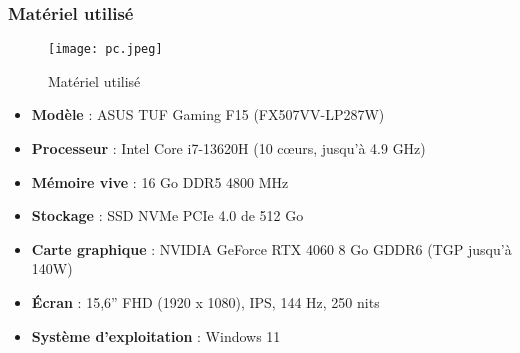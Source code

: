 \documentclass[12pt,a4paper]{report}
\begin{document}
\subsubsection*{Matériel utilisé}
\begin{figure}[H] 
    \centering
    \texttt{[image: pc.jpeg]}
    \caption{ Matériel utilisé}
    \label{fig:pc}
\end{figure}
\begin{itemize}
    \item \textbf{Modèle} : ASUS TUF Gaming F15 (FX507VV-LP287W)
    \item \textbf{Processeur} : Intel Core i7-13620H (10 cœurs, jusqu’à 4.9 GHz)
    \item \textbf{Mémoire vive} : 16 Go DDR5 4800 MHz 
    \item \textbf{Stockage} : SSD NVMe PCIe 4.0 de 512 Go
    \item \textbf{Carte graphique} : NVIDIA GeForce RTX 4060 8 Go GDDR6 (TGP jusqu’à 140W)
    \item \textbf{Écran} : 15,6'' FHD (1920 x 1080), IPS, 144 Hz, 250 nits
    \item \textbf{Système d’exploitation} : Windows 11 
\end{itemize}

\vspace{0.3cm}
\end{document}
